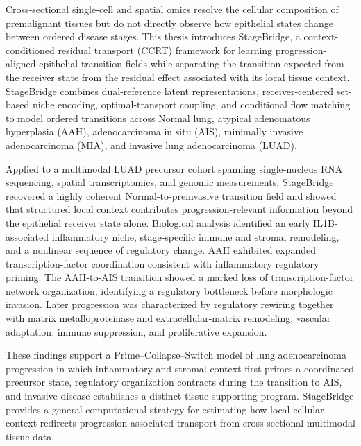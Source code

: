 
Cross-sectional single-cell and spatial omics resolve the cellular composition of premalignant tissues but do not directly observe how epithelial states change between ordered disease stages. This thesis introduces StageBridge, a context-conditioned residual transport (CCRT) framework for learning progression-aligned epithelial transition fields while separating the transition expected from the receiver state from the residual effect associated with its local tissue context. StageBridge combines dual-reference latent representations, receiver-centered set-based niche encoding, optimal-transport coupling, and conditional flow matching to model ordered transitions across Normal lung, atypical adenomatous hyperplasia (AAH), adenocarcinoma in situ (AIS), minimally invasive adenocarcinoma (MIA), and invasive lung adenocarcinoma (LUAD).

Applied to a multimodal LUAD precursor cohort spanning single-nucleus RNA sequencing, spatial transcriptomics, and genomic measurements, StageBridge recovered a highly coherent Normal-to-preinvasive transition field and showed that structured local context contributes progression-relevant information beyond the epithelial receiver state alone. Biological analysis identified an early IL1B-associated inflammatory niche, stage-specific immune and stromal remodeling, and a nonlinear sequence of regulatory change. AAH exhibited expanded transcription-factor coordination consistent with inflammatory regulatory priming. The AAH-to-AIS transition showed a marked loss of transcription-factor network organization, identifying a regulatory bottleneck before morphologic invasion. Later progression was characterized by regulatory rewiring together with matrix metalloproteinase and extracellular-matrix remodeling, vascular adaptation, immune suppression, and proliferative expansion.

These findings support a Prime--Collapse--Switch model of lung adenocarcinoma progression in which inflammatory and stromal context first primes a coordinated precursor state, regulatory organization contracts during the transition to AIS, and invasive disease establishes a distinct tissue-supporting program. StageBridge provides a general computational strategy for estimating how local cellular context redirects progression-associated transport from cross-sectional multimodal tissue data.


